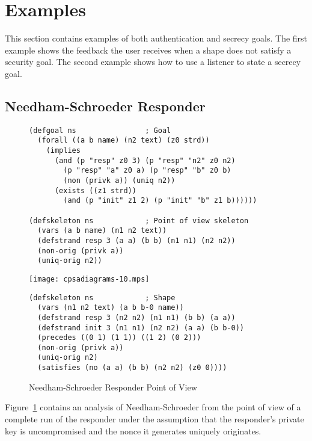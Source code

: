 \documentclass[12pt]{article}
\begin{document}
\section{Examples}\label{sec:examples}

This section contains examples of both authentication and secrecy
goals.  The first example shows the feedback the user receives when a
shape does not satisfy a security goal.  The second example shows how
to use a listener to state a secrecy goal.

\subsection{Needham-Schroeder Responder}\label{sec:ns resp}

\begin{figure}
\begin{verbatim}
(defgoal ns                ; Goal
  (forall ((a b name) (n2 text) (z0 strd))
    (implies
      (and (p "resp" z0 3) (p "resp" "n2" z0 n2)
        (p "resp" "a" z0 a) (p "resp" "b" z0 b)
        (non (privk a)) (uniq n2))
      (exists ((z1 strd))
        (and (p "init" z1 2) (p "init" "b" z1 b))))))

(defskeleton ns            ; Point of view skeleton
  (vars (a b name) (n1 n2 text))
  (defstrand resp 3 (a a) (b b) (n1 n1) (n2 n2))
  (non-orig (privk a))
  (uniq-orig n2))
\end{verbatim}
\begin{center}
\texttt{[image: cpsadiagrams-10.mps]}
\end{center}
\begin{verbatim}
(defskeleton ns            ; Shape
  (vars (n1 n2 text) (a b b-0 name))
  (defstrand resp 3 (n2 n2) (n1 n1) (b b) (a a))
  (defstrand init 3 (n1 n1) (n2 n2) (a a) (b b-0))
  (precedes ((0 1) (1 1)) ((1 2) (0 2)))
  (non-orig (privk a))
  (uniq-orig n2)
  (satisfies (no (a a) (b b) (n2 n2) (z0 0))))
\end{verbatim}
\caption{Needham-Schroeder Responder Point of View}
\label{fig:ns resp}
\end{figure}

Figure~\ref{fig:ns resp} contains an analysis of Needham-Schroeder
from the point of view of a complete run of the responder under the
assumption that the responder's private key is uncompromised and the
nonce it generates uniquely originates.
\end{document}
